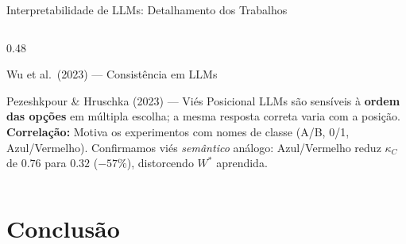 \documentclass[aspectratio=169, 8pt]{beamer}
\begin{document}
\begin{frame}{Interpretabilidade de LLMs: Detalhamento dos Trabalhos}
\begin{columns}[T]
\begin{column}{0.48\textwidth}
\begin{block}{\footnotesize Wu et al.\ (2023) --- Consistência em LLMs}
      \end{block}
      \vspace{0.2em}
      \begin{block}{\footnotesize Pezeshkpour \& Hruschka (2023) --- Viés Posicional}
        \scriptsize
        LLMs são sensíveis à \textbf{ordem das opções} em
        múltipla escolha; a mesma resposta correta varia com a posição.\\[2pt]
        \textcolor{myblue}{\textbf{Correlação:}} Motiva os experimentos com
        nomes de classe (A/B, 0/1, Azul/Vermelho). Confirmamos viés
        \emph{semântico} análogo: Azul/Vermelho reduz $\kappa_C$ de
        $0.76$ para $0.32$ ($-57\%$), distorcendo $W^*$ aprendida.
      \end{block}
    \end{column}
  \end{columns}
\end{frame}

\section{Conclusão}
\end{document}
